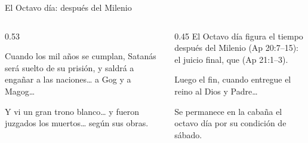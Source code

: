 \begin{frame}{El Octavo día: después del Milenio}
\begin{columns}[t,onlytextwidth]
\begin{column}{0.53\textwidth}
\begin{cita}Cuando los mil años se cumplan, Satanás será suelto de su prisión, y saldrá a engañar a las naciones\ldots{} a Gog y a Magog\ldots{}\end{cita}
\begin{cita}Y vi un gran trono blanco\ldots{} y fueron juzgados los muertos\ldots{} según sus obras.\end{cita}
\end{column}
\begin{column}{0.45\textwidth}\small
El Octavo día figura el tiempo después del Milenio (Ap 20:7--15): el juicio final, que  (Ap 21:1--3).\par\medskip
\begin{cita}Luego el fin, cuando entregue el reino al Dios y Padre\ldots{}\end{cita}
\scriptsize Se permanece en la cabaña el octavo día por su condición de sábado.
\end{column}
\end{columns}
\end{frame}

